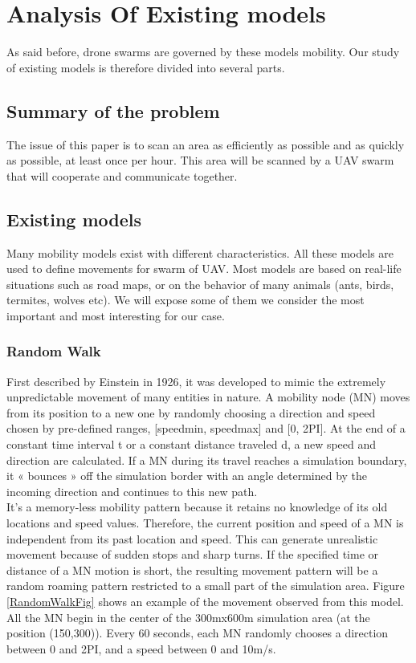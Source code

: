 \chapter{Analysis Of Existing models}

As said before, drone swarms are governed by these models mobility. Our study of existing models is therefore divided into several parts.

\section{Summary of the problem}

The issue of this paper is to scan an area as efficiently as possible and as quickly as possible, at least once per hour. This area will be scanned by a UAV swarm that will cooperate and communicate together.

\section{Existing models}

Many mobility models exist with different characteristics. All these models are used to define movements for swarm of UAV. Most models are based on real-life situations such as road maps, or on the behavior of many animals (ants, birds, termites, wolves etc). We will expose some of them we consider the most important and most interesting for our case.

\newpage

\subsection{Random Walk}

First described by Einstein in 1926, it was developed to mimic the extremely unpredictable movement of many entities in nature. A mobility node (MN) moves from its position to a new one by randomly choosing a direction and speed chosen by pre-defined ranges, [speedmin, speedmax] and [0, 2PI]. At the end of a constant time interval t or a constant distance traveled d, a new speed and direction are calculated. If a MN during its travel reaches a simulation boundary, it « bounces » off the simulation border with an angle determined by the incoming direction and continues to this new path.\\
It's a memory-less mobility pattern because it retains no knowledge of its old locations and speed values. Therefore, the current position and speed of a MN is independent from its past location and speed. This can generate unrealistic movement because of sudden stops and sharp turns. If the specified time or distance of a MN motion is short, the resulting movement pattern will be a random roaming pattern restricted to a small part of the simulation area. Figure \ref{RandomWalkFig} shows an example of the movement observed from this model. All the MN begin in the center of the 300mx600m simulation area (at the position (150,300)). Every 60 seconds, each MN randomly chooses a direction between 0 and 2PI, and a speed between 0 and 10m/s.\\

